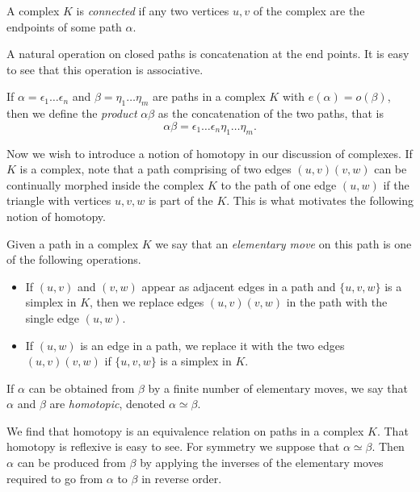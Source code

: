 \begin{definition}
  A complex $K$ is \emph{connected} if any two vertices $u,v$ of the complex are the endpoints of some path $\alpha$.
\end{definition}


A natural operation on closed paths is concatenation at the end points. It is easy to see that this operation is associative.

\begin{definition}
  If $\alpha = \epsilon_1 \dots \epsilon_n$ and $\beta = \eta_1 \dots \eta_m$ are paths in a complex $K$ with $e(\alpha) = o(\beta)$, then we define the \emph{product} $\alpha\beta$ as the concatenation of the two paths, that is
  \[
    \alpha\beta = \epsilon_1 \dots \epsilon_n\eta_1 \dots \eta_m.
  \]
\end{definition}

Now we wish to introduce a notion of homotopy in our discussion of complexes. If $K$ is a complex, note that a path comprising of two edges $(u,v)(v,w)$ can be continually morphed inside the complex $K$ to the path of one edge $(u,w)$ if the triangle with vertices $u,v,w$ is part of the $K$. This is what motivates the following notion of homotopy.

\begin{definition}
  Given a path in a complex $K$ we say that an \emph{elementary move} on this path is one of the following operations.
  \begin{itemize}
  \item If $(u,v)$ and $(v,w)$ appear as adjacent edges in a path and $\{u,v,w\}$ is a simplex in $K$, then we replace edges $(u,v)(v,w)$ in the path with the single edge $(u,w)$.
  \item If $(u,w)$ is an edge in a path, we replace it with the two edges $(u,v)(v,w)$ if $\{u,v,w\}$ is a simplex in $K$.
  \end{itemize}
  If $\alpha$ can be obtained from $\beta$ by a finite number of elementary moves, we say that $\alpha$ and $\beta$ are \emph{homotopic}, denoted $\alpha \simeq \beta$.
\end{definition}


We find that homotopy is an equivalence relation on paths in a complex $K$. That homotopy is reflexive is easy to see. For symmetry  we suppose that $\alpha \simeq \beta$. Then  $\alpha$ can be produced from $\beta$ by applying the inverses of the elementary moves required to go from $\alpha$ to $\beta$ in reverse order. %

